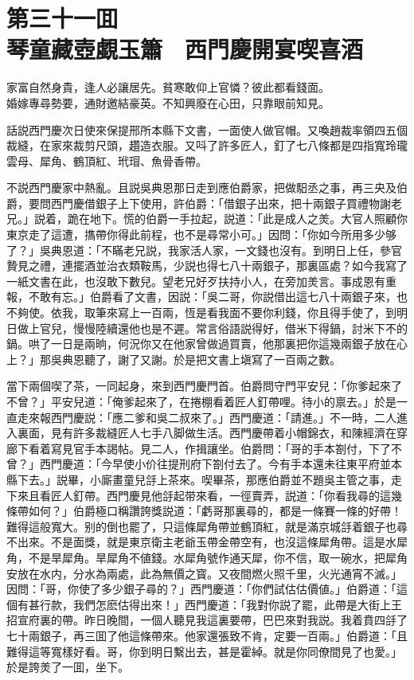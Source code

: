 
\chapter*{第三十一囬　\\琴童藏壺覷玉簫　西門慶開宴喫喜酒}


\begin{myquote}
家富自然身貴，逢人必讓居先。貧寒敢仰上官憐？彼此都看錢面。\\
婚嫁專尋勢要，通財邀結豪英。不知興廢在心田，只靠眼前知見。
\end{myquote}

話説西門慶次日使來保提邢所本縣下文書，一面使人做官帽。又喚趙裁率領四五個裁縫，在家來裁剪尺頭，趲造衣服。又呌了許多匠人，釘了七八條都是四指寬玲瓏雲母、犀角、鶴頂紅、玳瑁、魚骨香帶。

不説西門慶家中熱亂。且説吳典恩那日走到應伯爵家，把做馹丞之事，再三央及伯爵，要問西門慶借銀子上下使用，許伯爵：「借銀子出來，把十兩銀子買禮物謝老兄。」説着，跪在地下。慌的伯爵一手拉起，説道：「此是成人之羙。大官人照顧你東京走了這遭，㩦帶你得此前程，也不是尋常小可。」因問：「你如今所用多少够了？」吳典恩道：「不瞞老兄説，我家活人家，一文錢也沒有。到明日上任，參官贄見之禮，連擺酒並治衣類鞍馬，少説也得七八十兩銀子，那裏區處？如今我寫了一紙文書在此，也沒敢下數兒。望老兄好歹扶持小人，在旁加羙言。事成恩有重報，不敢有忘。」伯爵看了文書，因説：「吳二哥，你説借出這七八十兩銀子來，也不夠使。依我，取筆來寫上一百兩，恆是看我面不要你利錢，你且得手使了，到明日做上官兒，慢慢陸續還他也是不遲。常言俗語説得好，借米下得鍋，討米下不的鍋。哄了一日是兩晌，何況你又在他家曾做過買賣，他那裏把你這幾兩銀子放在心上？」那吳典恩聽了，謝了又謝。於是把文書上塡寫了一百兩之數。

當下兩個喫了茶，一同起身，來到西門慶門首。伯爵問守門平安兒：「你爹起來了不曾？」平安兒道：「俺爹起來了，在捲棚看着匠人釘帶哩。待小的禀去。」於是一直走來報西門慶説：「應二爹和吳二叔來了。」西門慶道：「請進。」不一時，二人進入裏面，見有許多裁縫匠人七手八脚做生活。西門慶帶着小帽錦衣，和陳經濟在穿廊下看着寫見官手本謁帖。見二人，作揖讓坐。伯爵問：「哥的手本劄付，下了不曾？」西門慶道：「今早使小价往提刑府下劄付去了。今有手本還未往東平府並本縣下去。」説畢，小廝畫童兒㧱上茶來。喫畢茶，那應伯爵並不題吳主管之事，走下來且看匠人釘帶。西門慶見他㧱起带來看，一徑賣弄，説道：「你看我尋的這幾條帶如何？」伯爵極口稱讚誇獎説道：「虧哥那裏尋的，都是一條賽一條的好帶！難得這般寬大。别的倒也罷了，只這條犀角帶並鶴頂紅，就是滿京城㧱着銀子也尋不出來。不是面獎，就是東京衛主老爺玉帶金帶空有，也沒這條犀角帶。這是水犀角，不是旱犀角。旱犀角不値錢。水犀角號作通天犀，你不信，取一碗水，把犀角安放在水内，分水為兩處，此為無價之寳。又夜間燃火照千里，火光通宵不滅。」因問：「哥，你使了多少銀子尋的？」西門慶道：「你們試估估價値。」伯爵道：「這個有甚行款，我們怎麽估得出來！」西門慶道：「我對你説了罷，此帶是大街上王招宣府裏的帶。昨日晚間，一個人聽見我這裏要帶，巴巴來對我説。我着賁四㧱了七十兩銀子，再三囬了他這條帶來。他家還張致不肯，定要一百兩。」伯爵道：「且難得這等寬樣好看。哥，你到明日繫出去，甚是霍綽。就是你同僚間見了也愛。」於是誇羙了一囬，坐下。

